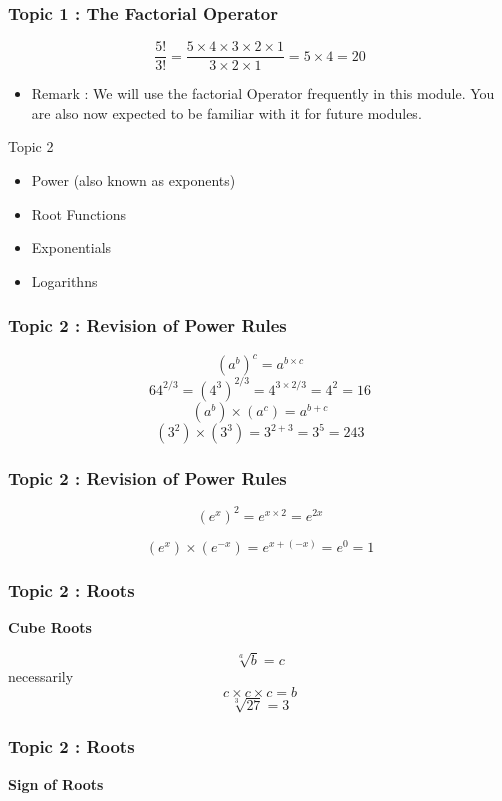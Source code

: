 \begin{itemize}
\begin{frame}
	\frametitle{Topic 1 : The Factorial Operator}	
	\[ \frac{5!}{3!} = \frac{5 \times 4 \times 3 \times 2 \times 1}{ 3 \times 2 \times 1 }  = 5 \times 4 = 20 \]
	
	\begin{itemize}
		\item Remark :  We will use the factorial Operator frequently in this module. You are also now expected to be familiar with it for future modules.
	\end{itemize}
\end{frame}
\begin{frame}
	\large
	Topic 2
	\begin{itemize}
	\item Power (also known as exponents)
	\item Root Functions
	\item Exponentials
	\item Logarithns
\end{itemize}
\end{frame}
\begin{frame}
	\frametitle{Topic 2 : Revision of Power Rules}
	\LARGE
	\[ (a^b)^c = a^{b \times c}\] \bigskip
	\[ 64^{2/3} =  (4^3)^{2/3} = 4^{3\times2/3} = 4^2 = 16 \] \bigskip
	\[ (a^b) \times (a^c) = a^{b+c}\] \bigskip
	\[ (3^2) \times (3^3) = 3^{2+3} = 3^5  =243 \]
\end{frame}

\begin{frame}
	\frametitle{Topic 2 : Revision of Power Rules}
	{
		\Large
		\[ (e^x)^2 = e^{x \times 2}  = e^{2x} \]
	}
	
	{
		\Large
		\[ (e^x) \times (e^{-x}) = e^{x + (-x)}  = e^{0} = 1 \]
	}
\end{frame}
\begin{frame}
	\frametitle{Topic 2 : Roots}
	\textbf{Cube Roots}
	
	\[  \sqrt[a]{b} = c \]  necessarily \[ c \times c \times c = b \]
	\[  \sqrt[3]{27} = 3 \]
\end{frame}
\begin{frame}
	\frametitle{Topic 2 : Roots}
	\textbf{Sign of Roots}
		

\end{frame}
\end{itemize}
